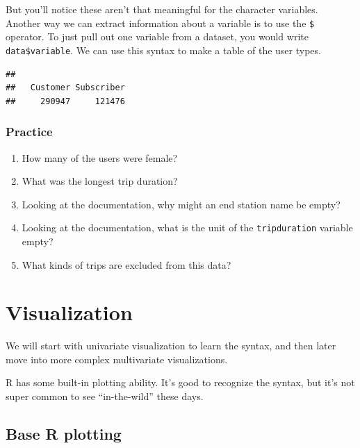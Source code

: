 \documentclass[]{book}
\newenvironment{Shaded}{\begin{snugshade}}{\end{snugshade}}
\newcommand{\KeywordTok}[1]{\textcolor[rgb]{0.13,0.29,0.53}{\textbf{#1}}}
\newcommand{\DecValTok}[1]{\textcolor[rgb]{0.00,0.00,0.81}{#1}}
\newcommand{\OperatorTok}[1]{\textcolor[rgb]{0.81,0.36,0.00}{\textbf{#1}}}
\newcommand{\NormalTok}[1]{#1}
\begin{document}
But you'll notice these aren't that meaningful for the character
variables. Another way we can extract information about a variable is to
use the \texttt{\$} operator. To just pull out one variable from a
dataset, you would write \texttt{data\$variable}. We can use this syntax
to make a table of the user types.

\begin{Shaded}
\end{Shaded}

\begin{verbatim}
## 
##   Customer Subscriber 
##     290947     121476
\end{verbatim}

\subsection{Practice}\label{practice}

\begin{enumerate}
\def\labelenumi{\arabic{enumi}.}
\item
  How many of the users were female?
\item
  What was the longest trip duration?
\item
  Looking at the documentation, why might an end station name be empty?
\item
  Looking at the documentation, what is the unit of the
  \texttt{tripduration} variable empty?
\item
  What kinds of trips are excluded from this data?
\end{enumerate}

\chapter{Visualization}\label{visualization}

We will start with univariate visualization to learn the syntax, and
then later move into more complex multivariate visualizations.

R has some built-in plotting ability. It's good to recognize the syntax,
but it's not super common to see ``in-the-wild'' these days.

\section{Base R plotting}\label{base-r-plotting}
\end{document}
